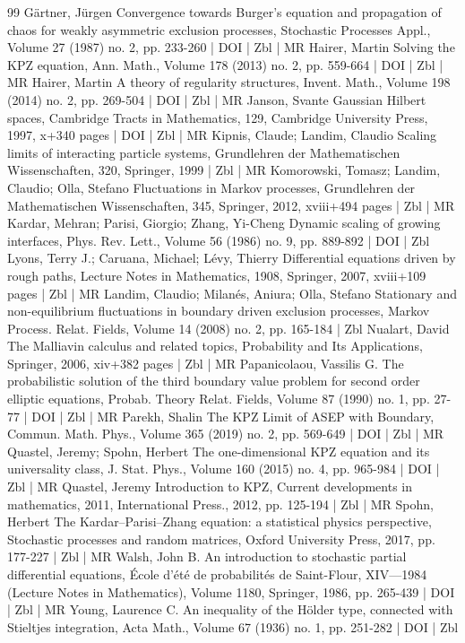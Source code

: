 \documentclass[10pt]{amsart}
\theoremstyle{definition}\newtheorem{defi}[theo]{Definition}\newtheorem{rema}[theo]{Remark}\newtheorem{exam}[theo]{Example}\newtheorem{exem}[theo]{Example}\newtheorem{nota}[theo]{Notation}
\begin{document}
\begin{thebibliography}{99}
Gärtner, Jürgen Convergence towards Burger’s equation and propagation of chaos for weakly asymmetric exclusion processes, Stochastic Processes Appl., Volume 27 (1987) no. 2, pp. 233-260 | DOI | Zbl | MR
Hairer, Martin Solving the KPZ equation, Ann. Math., Volume 178 (2013) no. 2, pp. 559-664 | DOI | Zbl | MR
Hairer, Martin A theory of regularity structures, Invent. Math., Volume 198 (2014) no. 2, pp. 269-504 | DOI | Zbl | MR
Janson, Svante Gaussian Hilbert spaces, Cambridge Tracts in Mathematics, 129, Cambridge University Press, 1997, x+340 pages | DOI | Zbl | MR
Kipnis, Claude; Landim, Claudio Scaling limits of interacting particle systems, Grundlehren der Mathematischen Wissenschaften, 320, Springer, 1999 | Zbl | MR
Komorowski, Tomasz; Landim, Claudio; Olla, Stefano Fluctuations in Markov processes, Grundlehren der Mathematischen Wissenschaften, 345, Springer, 2012, xviii+494 pages | Zbl | MR
Kardar, Mehran; Parisi, Giorgio; Zhang, Yi-Cheng Dynamic scaling of growing interfaces, Phys. Rev. Lett., Volume 56 (1986) no. 9, pp. 889-892 | DOI | Zbl
Lyons, Terry J.; Caruana, Michael; Lévy, Thierry Differential equations driven by rough paths, Lecture Notes in Mathematics, 1908, Springer, 2007, xviii+109 pages | Zbl | MR
Landim, Claudio; Milanés, Aniura; Olla, Stefano Stationary and non-equilibrium fluctuations in boundary driven exclusion processes, Markov Process. Relat. Fields, Volume 14 (2008) no. 2, pp. 165-184 | Zbl
Nualart, David The Malliavin calculus and related topics, Probability and Its Applications, Springer, 2006, xiv+382 pages | Zbl | MR
Papanicolaou, Vassilis G. The probabilistic solution of the third boundary value problem for second order elliptic equations, Probab. Theory Relat. Fields, Volume 87 (1990) no. 1, pp. 27-77 | DOI | Zbl | MR
Parekh, Shalin The KPZ Limit of ASEP with Boundary, Commun. Math. Phys., Volume 365 (2019) no. 2, pp. 569-649 | DOI | Zbl | MR
Quastel, Jeremy; Spohn, Herbert The one-dimensional KPZ equation and its universality class, J. Stat. Phys., Volume 160 (2015) no. 4, pp. 965-984 | DOI | Zbl | MR
Quastel, Jeremy Introduction to KPZ, Current developments in mathematics, 2011, International Press., 2012, pp. 125-194 | Zbl | MR
Spohn, Herbert The Kardar–Parisi–Zhang equation: a statistical physics perspective, Stochastic processes and random matrices, Oxford University Press, 2017, pp. 177-227 | Zbl | MR
Walsh, John B. An introduction to stochastic partial differential equations, École d’été de probabilités de Saint-Flour, XIV—1984 (Lecture Notes in Mathematics), Volume 1180, Springer, 1986, pp. 265-439 | DOI | Zbl | MR
Young, Laurence C. An inequality of the Hölder type, connected with Stieltjes integration, Acta Math., Volume 67 (1936) no. 1, pp. 251-282 | DOI | Zbl
\end{thebibliography}
\end{document}
